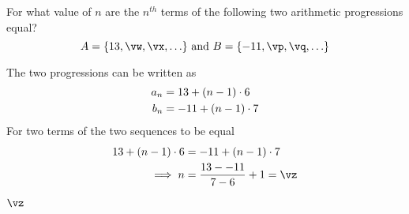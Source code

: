 

\ADD\va\vb\vw
\ADD\vw\vb\vx
\ADD\vc\vd\vp
\ADD\vp\vd\vq

\SUBTRACT\va\vc\vm
\SUBTRACT\vd\vb\vn
\DIVIDE\vm\vn\p
\ADD{}\vz

\question[2]  For what value of $n$ are the $n^{th}$ terms of the following two arithmetic progressions equal? 
\[ A = \lbrace \va,\vw,\vx,\ldots\rbrace\text{ and } B = \lbrace \vc,\vp,\vq,\ldots \rbrace \] 

\watchout

\begin{solution}[\halfpage]
	The two progressions can be written as 
	\begin{align}
		a_n &= 13 + (n-1)\cdot6 \\
		b_n &= -11 + (n-1)\cdot7 
	\end{align}
	For two terms of the two sequences to be equal
	\begin{align}
		\va + (n-1)\cdot\vb &= \vc+ (n-1)\cdot\vd \\
		\implies n &= \dfrac{\va - \vc}{\vd-\vb} + 1 = \vz
	\end{align}
\end{solution}
\ifprintanswers\begin{codex}$\vz$\end{codex}\fi
